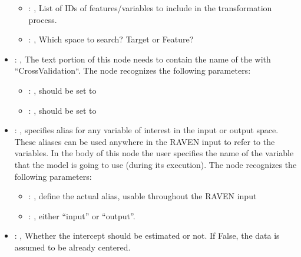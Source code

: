 \begin{itemize}
\begin{itemize}
        \item {}: , 
          List of IDs of features/variables to include in the transformation process.

        \item {}: , 
          Which space to search? Target or Feature?
      \end{itemize}

    \item {}: , 
      The text portion of this node needs to contain the name of the  with
               ``CrossValidation``.
      The  node recognizes the following parameters:
        \begin{itemize}
          \item {}: , 
            should be set to 
          \item {}: , 
            should be set to 
      \end{itemize}

    \item {}: , 
      specifies alias for         any variable of interest in the input or output space. These
      aliases can be used anywhere in the RAVEN input to         refer to the variables. In the body
      of this node the user specifies the name of the variable that the model is going to use
      (during its execution).
      The  node recognizes the following parameters:
        \begin{itemize}
          \item {}: , 
            define the actual alias, usable throughout the RAVEN input
          \item {}: , 
            either ``input'' or ``output''.
      \end{itemize}

    \item {}: , 
      Whether the intercept should be estimated or not. If False,
      the data is assumed to be already centered.


\end{itemize}
